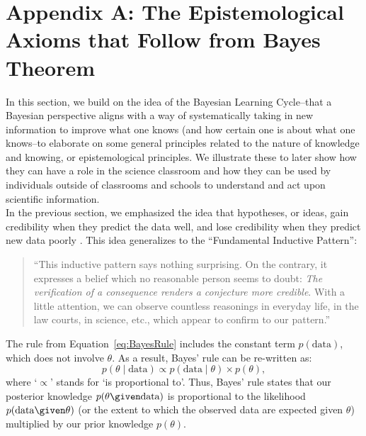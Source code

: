\section{Appendix A: The Epistemological Axioms that Follow from Bayes Theorem}

In this section, we build on the idea of the Bayesian Learning Cycle--that a Bayesian perspective aligns with a way of systematically taking in new information to improve what one knows (and how certain one is about what one knows--to elaborate on some general principles related to the nature of knowledge and knowing, or epistemological principles. We illustrate these to later show how they can have a role in the science classroom and how they can be used by individuals outside of classrooms and schools to understand and act upon scientific information. \\

In the previous section, we emphasized the idea that hypotheses, or ideas, gain credibility when they predict the data well, and lose credibility when they predict new data poorly \parencite{WagenmakersEtAl2016CD}. This idea generalizes to the ``Fundamental Inductive Pattern'':
\begin{quotation}

\noindent ``This inductive pattern says nothing surprising. On the contrary, it expresses a belief which no reasonable person seems to doubt: \emph{The verification of a consequence renders a conjecture more credible}. With a little attention, we can observe countless reasonings in everyday life, in the law courts, in science, etc., which appear to confirm to our pattern.'' \parencite[pp. 4-5]{Polya1954Vol2}
\end{quotation}

The rule from Equation~\ref{eq:BayesRule} includes the constant term $p(\text{data})$, which does not involve $\theta$. As a result, Bayes' rule can be re-written as:
\begin{equation}
\label{eq:BayesRulePropto}
p(\theta \mid \text{data}) \propto p(\text{data} \mid \theta) \times p(\theta),
\end{equation}
where `$\propto$' stands for `is proportional to'. Thus, Bayes' rule states that our posterior knowledge $p(\theta \given \text{data})$ is proportional to the likelihood $p(\text{data} \given \theta)$ (or the extent to which the observed data are expected given $\theta$) multiplied by our prior knowledge $p(\theta)$. \\

